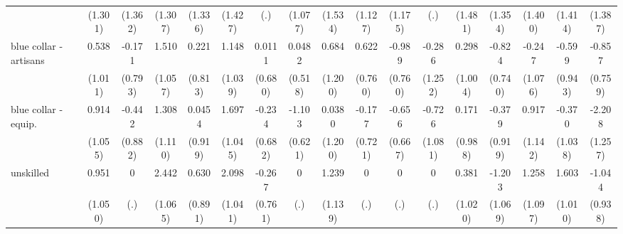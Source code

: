 {\begin{tabular}{l*{16}{c}}
                    &     (1.301)         &     (1.362)         &     (1.307)         &     (1.336)         &     (1.427)         &         (.)         &     (1.077)         &     (1.534)         &     (1.127)         &     (1.175)         &         (.)         &     (1.481)         &     (1.354)         &     (1.400)         &     (1.414)         &     (1.387)         \\
[1em]
blue collar - artisans&       0.538         &      -0.171         &       1.510         &       0.221         &       1.148         &      0.0111         &      0.0482         &       0.684         &       0.622         &      -0.989         &      -0.286         &       0.298         &      -0.824         &      -0.247         &      -0.599         &      -0.857         \\
                    &     (1.011)         &     (0.793)         &     (1.057)         &     (0.813)         &     (1.039)         &     (0.680)         &     (0.518)         &     (1.200)         &     (0.760)         &     (0.760)         &     (1.252)         &     (1.004)         &     (0.740)         &     (1.076)         &     (0.943)         &     (0.759)         \\
[1em]
blue collar - equip.&       0.914         &      -0.442         &       1.308         &      0.0454         &       1.697         &      -0.234         &      -1.103         &      0.0380         &      -0.177         &      -0.656         &      -0.726         &       0.171         &      -0.379         &       0.917         &      -0.370         &      -2.208         \\
                    &     (1.055)         &     (0.882)         &     (1.110)         &     (0.919)         &     (1.045)         &     (0.682)         &     (0.621)         &     (1.200)         &     (0.721)         &     (0.667)         &     (1.081)         &     (0.988)         &     (0.919)         &     (1.142)         &     (1.038)         &     (1.257)         \\
[1em]
unskilled           &       0.951         &           0         &       2.442\sym{*}  &       0.630         &       2.098\sym{*}  &      -0.267         &           0         &       1.239         &           0         &           0         &           0         &       0.381         &      -1.203         &       1.258         &       1.603         &      -1.044         \\
                    &     (1.050)         &         (.)         &     (1.065)         &     (0.891)         &     (1.041)         &     (0.761)         &         (.)         &     (1.139)         &         (.)         &         (.)         &         (.)         &     (1.020)         &     (1.069)         &     (1.097)         &     (1.010)         &     (0.938)         \\

\end{tabular}}
